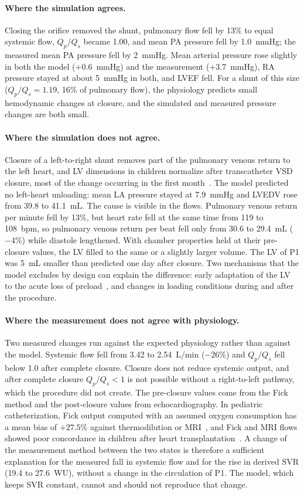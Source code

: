 \documentclass{article}
\begin{document}
\paragraph{Where the simulation agrees.} Closing the orifice removed the shunt, pulmonary flow fell by 13\% to equal systemic flow, $Q_p/Q_s$ became 1.00, and mean PA pressure fell by 1.0~mmHg; the measured mean PA pressure fell by 2~mmHg. Mean arterial pressure rose slightly in both the model ($+0.6$~mmHg) and the measurement ($+3.7$~mmHg), RA pressure stayed at about 5~mmHg in both, and LVEF fell. For a shunt of this size ($Q_p/Q_s = 1.19$, 16\% of pulmonary flow), the physiology predicts small hemodynamic changes at closure, and the simulated and measured pressure changes are both small.

\paragraph{Where the simulation does not agree.} Closure of a left-to-right shunt removes part of the pulmonary venous return to the left heart, and LV dimensions in children normalize after transcatheter VSD closure, most of the change occurring in the first month~\cite{Yuan2025}. The model predicted no left-heart unloading: mean LA pressure stayed at 7.9~mmHg and LVEDV rose from 39.8 to 41.1~mL. The cause is visible in the flows. Pulmonary venous return per minute fell by 13\%, but heart rate fell at the same time from 119 to 108~bpm, so pulmonary venous return per beat fell only from 30.6 to 29.4~mL ($-4\%$) while diastole lengthened. With chamber properties held at their pre-closure values, the LV filled to the same or a slightly larger volume. The LV of P1 was 5~mL smaller than predicted one day after closure. Two mechanisms that the model excludes by design can explain the difference: early adaptation of the LV to the acute loss of preload~\cite{Safa2023}, and changes in loading conditions during and after the procedure.

\paragraph{Where the measurement does not agree with physiology.} Two measured changes run against the expected physiology rather than against the model. Systemic flow fell from 3.42 to 2.54~L/min ($-26\%$) and $Q_p/Q_s$ fell below 1.0 after complete closure. Closure does not reduce systemic output, and after complete closure $Q_p/Q_s < 1$ is not possible without a right-to-left pathway, which the procedure did not create. The pre-closure values come from the Fick method and the post-closure values from echocardiography. In pediatric catheterization, Fick output computed with an assumed oxygen consumption has a mean bias of $+27.5\%$ against thermodilution or MRI~\cite{Ralston2023}, and Fick and MRI flows showed poor concordance in children after heart transplantation~\cite{Schramm2023}. A change of the measurement method between the two states is therefore a sufficient explanation for the measured fall in systemic flow and for the rise in derived SVR (19.4 to 27.6~WU), without a change in the circulation of P1. The model, which keeps SVR constant, cannot and should not reproduce that change.
\end{document}
